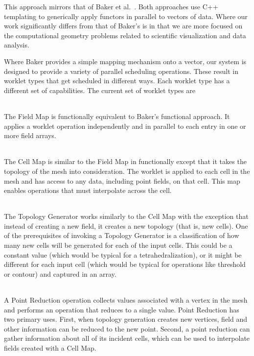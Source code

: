 \documentclass[conference]{IEEEtran}
\newcommand*{\scite}[1]{~\cite{#1}}
\newcommand{\etal}{et al.}
\begin{document}
This approach mirrors that of Baker \etal\scite{Baker2010}.  Both
approaches use C++ templating to generically apply functors in parallel to
vectors of data.  Where our work significantly differs from that of Baker's
is in that we are more focused on the computational geometry problems
related to scientific visualization and data analysis.

Where Baker provides a simple mapping mechanism onto a vector, our system
is designed to provide a variety of parallel scheduling operations.  These
result in worklet types that get scheduled in different ways.  Each worklet
type has a different set of capabilities.  The current set of worklet types
are

\begin{description}[\IEEEsetlabelwidth{\quad}]
\item[Field Map]~\\ The Field Map is functionally equivalent to Baker's
  functional approach.  It applies a worklet operation independently and in
  parallel to each entry in one or more field arrays.
\item[Cell Map]~\\ The Cell Map is similar to the Field Map in functionally
  except that it takes the topology of the mesh into consideration.  The
  worklet is applied to each cell in the mesh and has access to any data,
  including point fields, on that cell.  This map enables operations that
  must interpolate across the cell.
\item[Topology Generator]~\\ The Topology Generator works similarly to the
  Cell Map with the exception that instead of creating a new field, it
  creates a new topology (that is, new cells).  One of the prerequisites of
  invoking a Topology Generator is a classification of how many new cells
  will be generated for each of the input cells.  This could be a constant
  value (which would be typical for a tetrahedralization), or it might be
  different for each input cell (which would be typical for operations like
  threshold or contour) and captured in an array.
\item[Point Reduction]~\\ A Point Reduction operation collects values
  associated with a vertex in the mesh and performs an operation that
  reduces to a single value.  Point Reduction has two primary uses.  First,
  when topology generation creates new vertices, field and other
  information can be reduced to the new point.  Second, a point reduction
  can gather information about all of its incident cells, which can be used
  to interpolate fields created with a Cell Map.
\end{description}
\end{document}
